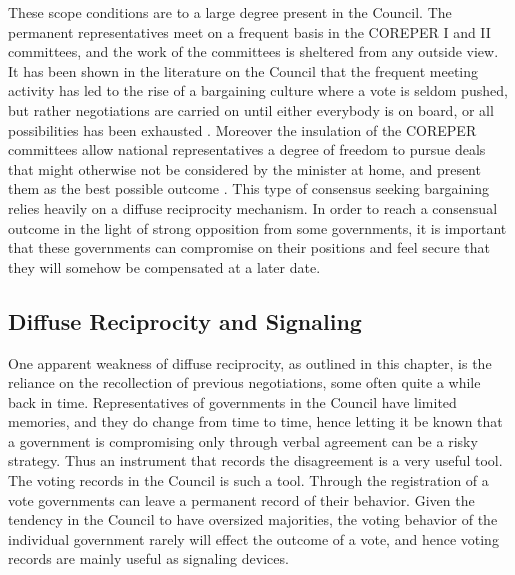 These scope conditions are to a large degree present in the Council. The permanent representatives meet on a frequent basis in the COREPER I and II committees, and the work of the committees is sheltered from any outside view. It has been shown in the literature on the Council that the frequent meeting activity has led to the rise of a bargaining culture where a vote is seldom pushed, but rather negotiations are carried on until either everybody is on board, or all possibilities has been exhausted \citep{Lewis1998,Lewis2003, BjurulfElgstrom2004}. Moreover the insulation of the COREPER committees allow national representatives  a degree of freedom to pursue deals that might otherwise not be considered by the minister at home, and present them as the best possible outcome \citep[947]{Lewis2005}. This type of consensus seeking bargaining relies heavily on a diffuse reciprocity mechanism. In order to reach a consensual outcome in the light of strong opposition from some governments, it is important that these governments can compromise on their positions and feel secure that they will somehow be compensated at a later date. 


\subsection{Diffuse Reciprocity and Signaling}

One apparent weakness of diffuse reciprocity, as outlined in this chapter, is the reliance on the recollection of previous negotiations, some often quite a while back in time. Representatives of governments in the Council have limited memories, and they do change from time to time, hence letting it be known that a government is compromising only through verbal agreement can be a risky strategy. Thus an instrument that records the disagreement is a very useful tool. The voting records in the Council is such a tool. Through the registration of a vote governments can leave a permanent record of their behavior. Given the tendency in the Council to have oversized majorities, the voting behavior of the individual government rarely will effect the outcome of a vote, and hence voting records are mainly useful as signaling devices.

